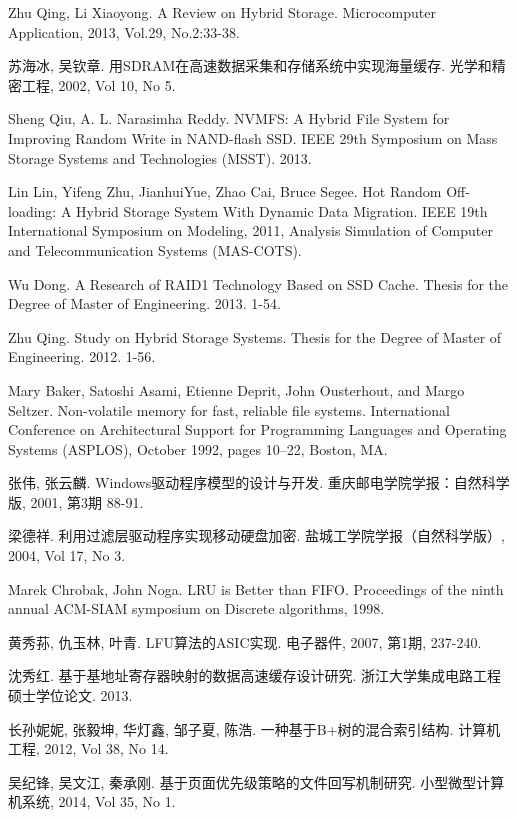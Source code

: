 \begin{thebibliography}
Zhu Qing, Li Xiaoyong. A Review on Hybrid Storage. Microcomputer Application, 2013, Vol.29, No.2:33-38.

苏海冰, 吴钦章. 用SDRAM在高速数据采集和存储系统中实现海量缓存. 光学和精密工程, 2002, Vol 10, No 5.

Sheng Qiu, A. L. Narasimha Reddy. NVMFS: A Hybrid File System for Improving Random Write in NAND-flash SSD. IEEE 29th Symposium on Mass Storage Systems and Technologies (MSST). 2013.

Lin Lin, Yifeng Zhu, JianhuiYue, Zhao Cai, Bruce Segee. Hot Random Off-loading: A Hybrid Storage System With Dynamic Data Migration. IEEE 19th International Symposium on Modeling, 2011, Analysis Simulation of Computer and Telecommunication Systems (MAS-COTS).

Wu Dong. A Research of RAID1 Technology Based on SSD Cache. Thesis for the Degree of Master of Engineering. 2013. 1-54.

Zhu Qing. Study on Hybrid Storage Systems. Thesis for the Degree of Master of Engineering. 2012. 1-56.

Mary Baker, Satoshi Asami, Etienne Deprit, John Ousterhout, and Margo Seltzer. Non-volatile memory for fast, reliable file systems. International Conference on Architectural Support for Programming Languages and Operating Systems (ASPLOS), October 1992, pages 10–22, Boston, MA.

张伟, 张云麟. Windows驱动程序模型的设计与开发. 重庆邮电学院学报：自然科学版, 2001, 第3期 88-91.

梁德祥. 利用过滤层驱动程序实现移动硬盘加密. 盐城工学院学报（自然科学版）, 2004, Vol 17, No 3.

Marek Chrobak, John Noga. LRU is Better than FIFO. Proceedings of the ninth annual ACM-SIAM symposium on Discrete algorithms, 1998.

黄秀荪, 仇玉林, 叶青. LFU算法的ASIC实现. 电子器件, 2007, 第1期, 237-240.

沈秀红. 基于基地址寄存器映射的数据高速缓存设计研究. 浙江大学集成电路工程硕士学位论文. 2013.

长孙妮妮, 张毅坤, 华灯鑫, 邹子夏, 陈浩. 一种基于B+树的混合索引结构. 计算机工程, 2012, Vol 38, No 14.

吴纪锋, 吴文江, 秦承刚. 基于页面优先级策略的文件回写机制研究. 小型微型计算机系统, 2014, Vol 35, No 1.


\end{thebibliography}
